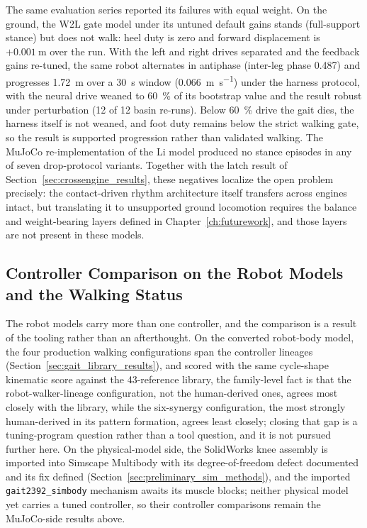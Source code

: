 The same evaluation series reported its failures with equal weight. On the ground, the W2L gate model under its untuned default gains stands (full-support stance) but does not walk: heel duty is zero and forward displacement is $+\qty{0.001}{\meter}$ over the run. With the left and right drives separated and the feedback gains re-tuned, the same robot alternates in antiphase (inter-leg phase 0.487) and progresses \qty{1.72}{\meter} over a \qty{30}{\second} window (\qty{0.066}{\metre\per\second}) under the harness protocol, with the neural drive weaned to \qty{60}{\percent} of its bootstrap value and the result robust under perturbation (12 of 12 basin re-runs). Below \qty{60}{\percent} drive the gait dies, the harness itself is not weaned, and foot duty remains below the strict walking gate, so the result is supported progression rather than validated walking. The MuJoCo re-implementation of the Li model produced no stance episodes in any of seven drop-protocol variants. Together with the latch result of Section~\ref{sec:crossengine_results}, these negatives localize the open problem precisely: the contact-driven rhythm architecture itself transfers across engines intact, but translating it to unsupported ground locomotion requires the balance and weight-bearing layers defined in Chapter~\ref{ch:futurework}, and those layers are not present in these models.

\subsection{Controller Comparison on the Robot Models and the Walking Status}\label{sec:sns_controller_comparison}

The robot models carry more than one controller, and the comparison is a result of the tooling rather than an afterthought. On the converted robot-body model, the four production walking configurations span the controller lineages (Section~\ref{sec:gait_library_results}), and scored with the same cycle-shape kinematic score against the 43-reference library, the family-level fact is that the robot-walker-lineage configuration, not the human-derived ones, agrees most closely with the library, while the six-synergy configuration, the most strongly human-derived in its pattern formation, agrees least closely; closing that gap is a tuning-program question rather than a tool question, and it is not pursued further here. On the physical-model side, the SolidWorks knee assembly is imported into Simscape Multibody with its degree-of-freedom defect documented and its fix defined (Section~\ref{sec:preliminary_sim_methods}), and the imported \texttt{gait2392\_simbody} mechanism awaits its muscle blocks; neither physical model yet carries a tuned controller, so their controller comparisons remain the MuJoCo-side results above.

